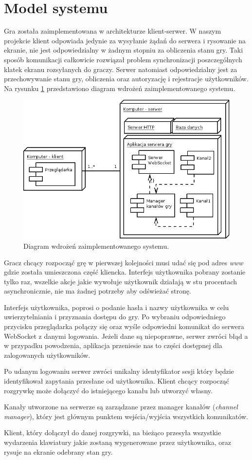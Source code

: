 \section{Model systemu}
Gra została zaimplementowana w architekturze klient-serwer. W naszym projekcie klient odpowiada jedynie za wysyłanie żądań do serwera i rysowanie na ekranie, nie jest odpowiedzialny w żadnym stopniu za obliczenia stanu gry. Taki sposób komunikacji całkowicie rozwiązał problem synchronizacji poszczególnych klatek ekranu rozsyłanych do graczy. Serwer natomiast odpowiedzialny jest za przechowywanie stanu gry, obliczenia oraz autoryzację i rejestracje użytkowników. Na rysunku \ref{fig:ddiag} przedstawiono diagram wdrożeń zaimplementowanego systemu.

\begin{figure}[ht]
    \centering
    \includegraphics[scale=0.5]{imgs/ddiagram.png}
    \caption{Diagram wdrożeń zaimplementowanego systemu.}
    \label{fig:ddiag}
\end{figure}

Gracz chcący rozpocząć grę w pierwszej kolejności musi udać się pod adres \emph{www} gdzie została umieszczona część kliencka. Interfejs użytkownika pobrany zostanie tylko raz, wszelkie akcje jakie wywołuje użytkownik działają w stu procentach asynchronicznie, nie ma żadnej potrzeby aby odświeżać stronę.

Interfejs użytkownika, poprosi o podanie hasła i nazwy użytkownika w celu uwierzytelniania i przyznania dostępu do gry. Po wybraniu odpowiedniego przycisku przeglądarka połączy się oraz wyśle odpowiedni komunikat do serwera WebSocket z danymi logowania. Jeżeli dane są niepoprawne, serwer zwróci błąd a w przypadku powodzenia, aplikacja przeniesie nas to części dostępnej dla zalogowanych użytkowników.

Po udanym logowaniu serwer zwróci unikalny identyfikator sesji który będzie identyfikował zapytania przesłane od użytkownika. Klient chcący rozpocząć rozgrywkę może dołączyć do istniejącego kanału lub utworzyć własny.

Kanały utworzone na serwerze są zarządzane przez manager kanałów (\emph{channel manager}), który jest głównym punktem wejścia/wyjścia wszystkich komunikatów.

Klient, który dołączył do danej rozgrywki, na bieżąco przesyła wszystkie wydarzenia klawiatury jakie zostaną wygenerowane przez użytkownika, oraz rysuje na ekranie odebrany stan gry.
